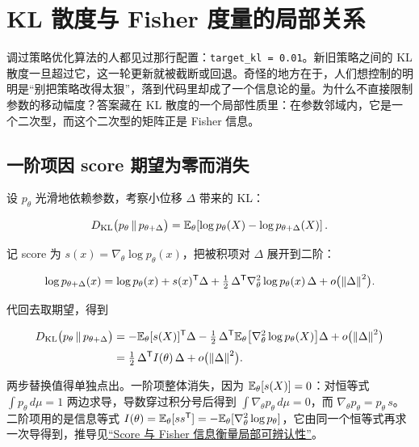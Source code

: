 \section{KL 散度与 Fisher 度量的局部关系}
\label{sec:12-Real-Analysis-Support/09-Information-Geometry/03}

调过策略优化算法的人都见过那行配置：\texttt{target\_kl = 0.01}。新旧策略之间的 KL 散度一旦超过它，这一轮更新就被截断或回退。奇怪的地方在于，人们想控制的明明是``别把策略改得太狠''，落到代码里却成了一个信息论的量。为什么不直接限制参数的移动幅度？答案藏在 KL 散度的一个局部性质里：在参数邻域内，它是一个二次型，而这个二次型的矩阵正是 Fisher 信息。

\subsection{一阶项因 score 期望为零而消失}

设 \(p_\theta\) 光滑地依赖参数，考察小位移 \(\Delta\) 带来的 KL：

\[
D_{\mathrm{KL}}\bigl(p_\theta\,\|\,p_{\theta+\Delta}\bigr)
=\mathbb{E}_\theta\!\left[\log p_\theta(X)-\log p_{\theta+\Delta}(X)\right].
\]

记 score 为 \(s(x)=\nabla_\theta\log p_\theta(x)\)，把被积项对 \(\Delta\) 展开到二阶：

\[
\log p_{\theta+\Delta}(x)=\log p_\theta(x)+s(x)^{\mathsf{T}}\Delta
+\tfrac12\,\Delta^{\mathsf{T}}\nabla_\theta^2\log p_\theta(x)\,\Delta
+o\bigl(\left\lVert\Delta\right\rVert^2\bigr).
\]

代回去取期望，得到

\[
\begin{aligned}
D_{\mathrm{KL}}\bigl(p_\theta\,\|\,p_{\theta+\Delta}\bigr)
&=-\mathbb{E}_\theta[s(X)]^{\mathsf{T}}\Delta
-\tfrac12\,\Delta^{\mathsf{T}}\mathbb{E}_\theta\bigl[\nabla_\theta^2\log p_\theta(X)\bigr]\Delta
+o\bigl(\left\lVert\Delta\right\rVert^2\bigr)\\[2pt]
&=\tfrac12\,\Delta^{\mathsf{T}}I(\theta)\,\Delta+o\bigl(\left\lVert\Delta\right\rVert^2\bigr).
\end{aligned}
\]

两步替换值得单独点出。一阶项整体消失，因为 \(\mathbb{E}_\theta[s(X)]=0\)：对恒等式 \(\int p_\theta\,d\mu=1\) 两边求导，导数穿过积分号后得到 \(\int\nabla_\theta p_\theta\,d\mu=0\)，而 \(\nabla_\theta p_\theta=p_\theta\,s\)。二阶项用的是信息等式 \(I(\theta)=\mathbb{E}_\theta[ss^{\mathsf{T}}]=-\mathbb{E}_\theta[\nabla_\theta^2\log p_\theta]\)，它由同一个恒等式再求一次导得到，推导见\hyperref[sec:11-Mathematical-Statistics/03-Sufficient-Statistics-and-Information/02]{``Score 与 Fisher 信息衡量局部可辨认性''}。

